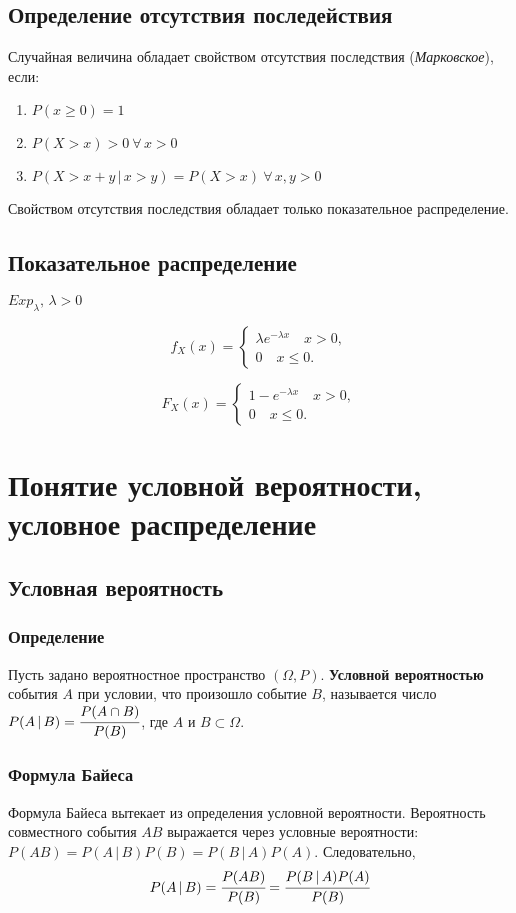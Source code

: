 \documentclass{article}
\begin{document}
\subsection{Определение отсутствия последействия}
Случайная величина обладает свойством отсутствия последствия (\textit{Марковское}), если:
\begin{enumerate}
    \item $P(x\geq0)=1$
    \item$P(X>x)>0\:\forall\,x>0$
    \item $P(X>x+y\,|\,x>y)=P(X>x)\:\forall\,x,y>0$
\end{enumerate}
Свойством отсутствия последствия обладает только показательное распределение.

\subsection{Показательное распределение}
$Exp_{\lambda},\,\lambda>0$

$$f_X(x)=\begin{cases}\lambda e^{-\lambda x}\quad x>0,\\0\quad x\leq 0.\end{cases}$$

$$F_X(x)=\begin{cases}1- e^{-\lambda x}\quad x>0,\\0\quad x\leq 0.\end{cases}$$
\newpage
\section{Понятие условной вероятности, условное распределение}
\subsection{Условная вероятность}
\subsubsection{Определение}
Пусть задано вероятностное пространство $(\Omega,P)$. \textbf{Условной вероятностью} события $A$ при условии, что произошло событие $B$, называется число $P(A\,|\,B)=\cfrac{P(A\cap B)}{P(B)}$, где $A$ и $B\subset\Omega$.
\subsubsection{Формула Байеса}
Формула Байеса вытекает из определения условной вероятности. Вероятность совместного события $AB$ выражается через условные вероятности: $P(AB)=P(A\,|\,B)P(B)=P(B\,|\,A)P(A)$. Следовательно, 
$$ P(A\,|\,B)=\cfrac{P(AB)}{P(B)}=\cfrac{P(B\,|\,A)P(A)}{P(B)} $$
\end{document}
